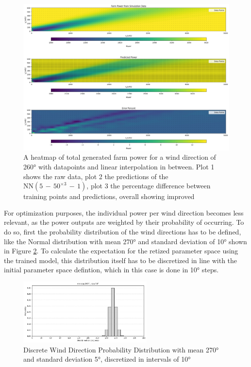 \documentclass[preprint,12pt]{elsarticle}
\begin{document}
\begin{figure}[h] 
	\centering
	\includegraphics[width=1\textwidth]{../figures/optimization/prob_model_colormap_2.png} 
	\caption{A heatmap of total generated farm power for a wind direction of 260° with datapoints and linear interpolation in between. Plot 1 shows the raw data, plot 2 the predictions of the $\text{NN}(5\,{-}\,50^{\times3}\,{-}\,1)$, plot 3 the percentage difference between training points and predictions, overall showing improved }
	\label{fig:prob_model_colormap_2}
\end{figure}

For optimization purposes, the individual power per wind direction becomes less relevant, as the power outputs are weighted by their probability of occurring. 
To do so, first the probability distribution of the wind directions has to be defined, like the Normal distribution with mean 270° and standard deviation of 10° shown in Figure \ref{fig:wind_dist_opti}. To calculate the expectation for the retized parameter space using the trained model, this distribution itself has to be discretized in line with the initial parameter space defintion, which in this case is done in 10° steps. 


\begin{figure}[h] 
	\centering
	\includegraphics[width=0.6\textwidth]{../figures/optimization/wind_dist_opti.png} 
	\caption{Discrete Wind Direction Probability Distribution with mean 270° and standard deviation 5°, discretized in intervals of 10° }
	\label{fig:wind_dist_opti}
\end{figure}
\end{document}
